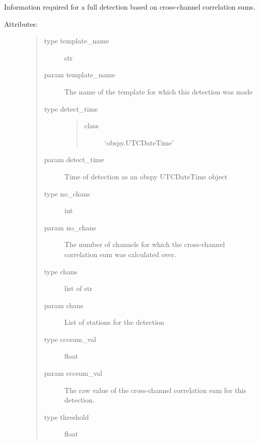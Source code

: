 \documentclass[a4paper,10pt,english]{sphinxmanual}
\begin{document}
\begin{fulllineitems}
\label{core:match_filter.DETECTION}
Information required for a full detection based on cross-channel
correlation sums.
\begin{description}
\item[{Attributes:}] \leavevmode\begin{quote}\begin{description}
\item[{type template\_name}] \leavevmode
str

\item[{param template\_name}] \leavevmode
The name of the template for which this detection        was made

\item[{type detect\_time}] \leavevmode\begin{quote}\begin{description}
\item[{class}] \leavevmode
`obspy.UTCDateTime'

\end{description}\end{quote}

\item[{param detect\_time}] \leavevmode
Time of detection as an obspy UTCDateTime object

\item[{type no\_chans}] \leavevmode
int

\item[{param no\_chans}] \leavevmode
The number of channels for which the cross-channel        correlation sum was calculated over.

\item[{type chans}] \leavevmode
list of str

\item[{param chans}] \leavevmode
List of stations for the detection

\item[{type cccsum\_val}] \leavevmode
float

\item[{param cccsum\_val}] \leavevmode
The raw value of the cross-channel correlation sum        for this detection.

\item[{type threshold}] \leavevmode
float


\end{description}
\end{quote}
\end{description}
\end{fulllineitems}
\end{document}

